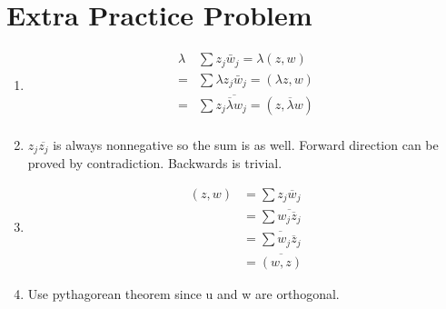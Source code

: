 \documentclass{article}
\begin{document}
\section*{Extra Practice Problem}
\begin{enumerate}
    \item 
    \begin{align*}
        \lambda &\sum z_j \bar{w}_j  = \lambda(z, w) \\
        =& \sum \lambda z_j \bar{w}_j = (\lambda z, w) \\
        =& \sum z_j \overline{\overline{\lambda} w}_j = (z, \overline{\lambda}w)\\   
    \end{align*}
    \item $z_j\overline{z_j}$ is always nonnegative so the sum is as well.
    Forward direction can be proved by contradiction. Backwards is trivial.
    \item 
    \begin{align*}
        (z, w) &= \sum z_j \overline{w}_j \\
               &= \sum \overline{w_j \overline{z}_j} \\
               &= \overline{\sum w_j \overline{z}_j} \\
               &= \overline{(w,z)}
    \end{align*}
    \item Use pythagorean theorem since u and w are orthogonal.
    
    
\end{enumerate}
\end{document}
